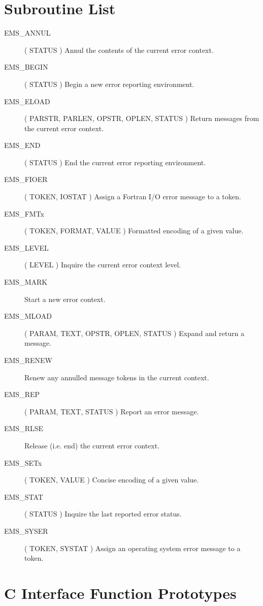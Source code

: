 \newpage
\section {Subroutine List}

\begin {description} 
\item [EMS\_ANNUL] ( STATUS ) 
\subitem Annul the contents of the current error context.
\indexspace
\item [EMS\_BEGIN] ( STATUS )
\subitem Begin a new error reporting environment.
\indexspace
\item [EMS\_ELOAD] ( PARSTR, PARLEN, OPSTR, OPLEN, STATUS ) 
\subitem Return messages from the current error context.
\indexspace
\item [EMS\_END] ( STATUS )
\subitem End the current error reporting environment.
\indexspace
\item [EMS\_FIOER] ( TOKEN, IOSTAT ) 
\subitem Assign a Fortran I/O error message to a token.
\indexspace
\item [EMS\_FMTx] ( TOKEN, FORMAT, VALUE ) 
\subitem Formatted encoding of a given value. 
\indexspace 
\item [EMS\_LEVEL] ( LEVEL )
\subitem Inquire the current error context level.
\indexspace
\item [EMS\_MARK] \hfill
\subitem Start a new error context.
\indexspace
\item [EMS\_MLOAD] ( PARAM, TEXT, OPSTR, OPLEN, STATUS ) 
\subitem Expand and return a message. 
\indexspace 
\item [EMS\_RENEW] \hfill
\subitem Renew any annulled message tokens in the current context.
\indexspace
\item [EMS\_REP] ( PARAM, TEXT, STATUS ) 
\subitem Report an error message.
\indexspace
\item [EMS\_RLSE] \hfill
\subitem Release (i.e. end) the current error context.
\indexspace
\item [EMS\_SETx] ( TOKEN, VALUE ) 
\subitem Concise encoding of a given value. 
\indexspace 
\item [EMS\_STAT] ( STATUS )
\subitem Inquire the last reported error status.
\indexspace
\item [EMS\_SYSER] ( TOKEN, SYSTAT ) 
\subitem Assign an operating system error message to a token.
\end {description}

\newpage
\section {C Interface Function Prototypes} \label{C_sect}

